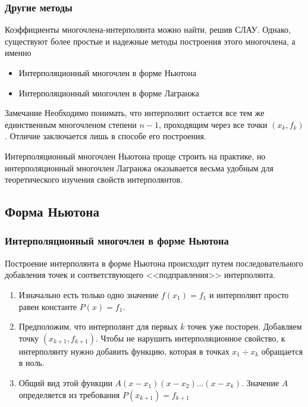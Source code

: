 \documentclass[aspectratio=169,unicode]{beamer}
\begin{document}
\begin{frame}
\frametitle{Другие методы}
	Коэффициенты многочлена-интерполянта можно найти, решив СЛАУ. Однако, существуют более
	простые и надежные методы построения этого многочлена, а именно
	\begin{itemize}
		\item Интерполяционный многочлен в форме Ньютона
		\item Интерполяционный многочлен в форме Лагранжа
	\end{itemize}
	\pause

	\begin{block}{Замечание}
	Необходимо понимать, что интерполянт остается все тем же единственным многочленом степени $n-1$,
	проходящим через все точки $(x_k, f_k)$. Отличие заключается лишь в способе его построения.
	\end{block}
	\pause

	Интерполяционный многочлен Ньютона проще строить на практике, но интерполяционный многочлен Лагранжа
	оказывается весьма удобным для теоретического изучения свойств интерполянтов.
\end{frame}

\subsection{Форма Ньютона}
\begin{frame}
\frametitle{Интерполяционный многочлен в форме Ньютона}
	Построение интерполянта в форме Ньютона происходит путем последовательного добавления точек и
	соответствующего <<подправления>> интерполянта.
	\begin{enumerate}
	\pause
	\item Изначально есть только одно значение $f(x_1) = f_1$ и интерполянт просто равен константе $P(x) = f_1$.
	\pause
	\item Предположим, что интерполянт для первых $k$ точек уже посторен. Добавляем точку $(x_{k+1}, f_{k+1})$.
	Чтобы не нарушить интерполяционное свойство, к интерполянту нужно добавить функцию, которая в точках $x_1 \div x_k$ обращается в ноль.
	\item Общий вид этой функции $A(x-x_1)(x-x_2)\dots(x-x_k)$. Значение $A$ определяется из требования $P(x_{k+1}) = f_{k+1}$
	\end{enumerate}
\end{frame}
\end{document}

